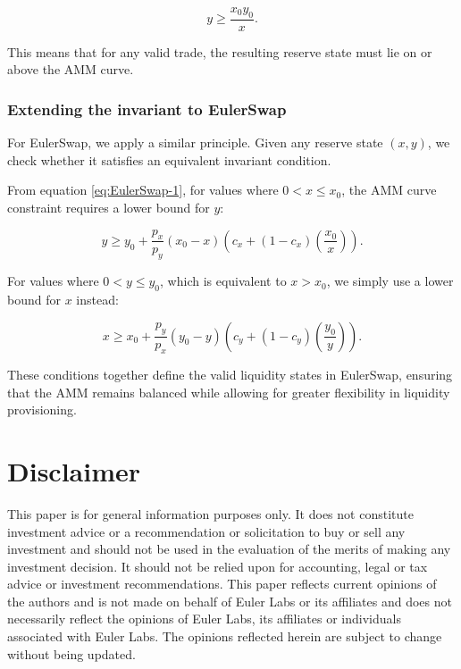 \documentclass{article}
\begin{document}
\begin{equation}
    y \geq \frac{x_0 y_0}{x}.
\end{equation}

This means that for any valid trade, the resulting reserve state must lie on or above the AMM curve.  

\subsubsection{Extending the invariant to EulerSwap}

For EulerSwap, we apply a similar principle. Given any reserve state $(x, y)$, we check whether it satisfies an equivalent invariant condition.

From equation \eqref{eq:EulerSwap-1}, for values where \( 0 < x \leq x_0 \), the AMM curve constraint requires a lower bound for $y$:

\begin{equation}
    \label{eq:invariant-x1}
    y \geq y_{0}+\frac{p_{x}}{p_{y}}\left(x_{0}-x\right)\left(c_{x}+\left(1-c_{x}\right)\left(\frac{x_{0}}{x}\right)\right).
\end{equation}

For values where \( 0 < y \leq y_0 \), which is equivalent to \( x > x_0 \), we simply use a lower bound for $x$ instead:

\begin{equation}
    \label{eq:invariant-x2}
    x \geq x_{0}+\frac{p_{y}}{p_{x}}\left(y_{0}-y\right)\left(c_{y}+\left(1-c_{y}\right)\left(\frac{y_{0}}{y}\right)\right).
\end{equation}

These conditions together define the valid liquidity states in EulerSwap, ensuring that the AMM remains balanced while allowing for greater flexibility in liquidity provisioning.

\section{Disclaimer}

This paper is for general information purposes only. It does not constitute investment
advice or a recommendation or solicitation to buy or sell any investment and should not
be used in the evaluation of the merits of making any investment decision. It should not
be relied upon for accounting, legal or tax advice or investment recommendations. This
paper reflects current opinions of the authors and is not made on behalf of Euler Labs or its
affiliates and does not necessarily reflect the opinions of Euler Labs, its affiliates or individuals
associated with Euler Labs. The opinions reflected herein are subject to change without being
updated.
\end{document}
